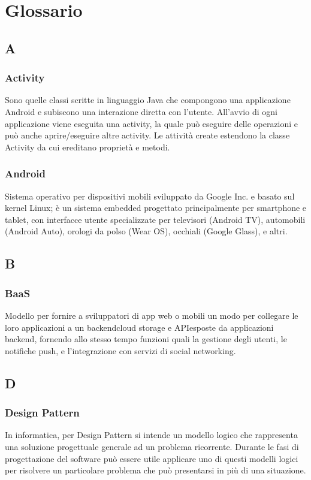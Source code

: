 \section{Glossario}
\subsection*{A}
\subsubsection*{Activity}
Sono quelle classi scritte in linguaggio Java che compongono una applicazione Android e subiscono
una interazione diretta con l'utente. All'avvio di ogni applicazione viene eseguita una activity, la
quale può eseguire delle operazioni e può anche aprire/eseguire altre activity. Le attività create
estendono la classe Activity da cui ereditano proprietà e metodi.

\subsubsection*{Android}
Sistema operativo per dispositivi mobili sviluppato da Google Inc. e basato sul kernel Linux; è
un sistema embedded progettato principalmente per smartphone e tablet, con interfacce utente
specializzate per televisori (Android TV), automobili (Android Auto), orologi da polso (Wear
OS), occhiali (Google Glass), e altri.

\subsection*{B}
\subsubsection*{BaaS}
Modello per fornire a sviluppatori di app web o mobili un modo per collegare le loro applicazioni a un backend\glosp cloud storage e API\glosp esposte da applicazioni backend\glosp, fornendo allo stesso tempo funzioni quali la gestione degli utenti, le notifiche push, e l'integrazione con servizi di social networking.

\subsection*{D}
\subsubsection*{Design Pattern}
In informatica, per Design Pattern si intende un modello logico che rappresenta una soluzione progettuale generale ad un problema ricorrente. Durante le fasi di progettazione del software può essere utile applicare uno di questi modelli logici per risolvere un particolare
problema che può presentarsi in più di una situazione.

